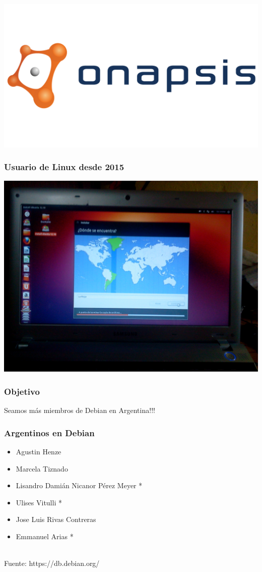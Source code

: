 \documentclass{beamer}
\begin{document}
\begin{frame}
		\includegraphics[width=0.7\linewidth]{images/onapsis}
\end{frame}

\begin{frame}
  \frametitle {Usuario de Linux desde 2015}
		\includegraphics[width=0.7\linewidth]{images/ubuntu.jpg}
\end{frame}


\begin{frame}
  \frametitle {Objetivo}
  \centering
    \Huge Seamos más miembros de Debian en Argentina!!!
\end{frame}

\begin{frame}
    \frametitle {Argentinos en Debian}
    \begin{itemize}
    	\item Agustin Henze
    	\item Marcela Tiznado
    	\item Lisandro Damián Nicanor Pérez Meyer *
    	\item Ulises Vitulli *
    	\item Jose Luis Rivas Contreras
    	\item Emmanuel Arias *
    \end{itemize}

    \vspace{1cm} \\
    \tiny Fuente: https://db.debian.org/
\end{frame}
\end{document}
